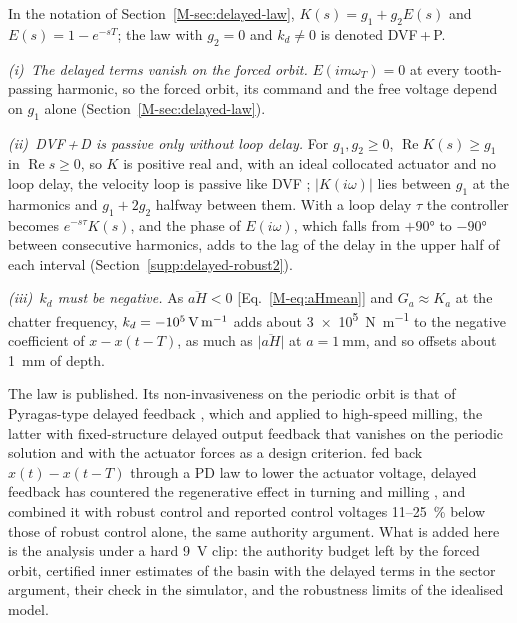 In the notation of Section~\ref{M-sec:delayed-law}, $K(s)=g_1+g_2E(s)$ and $E(s)=1-e^{-sT}$; the law with $g_2=0$ and $k_d\neq0$ is denoted DVF\,+\,P.

\emph{(i)~The delayed terms vanish on the forced orbit.} $E(im\omega_T)=0$ at every tooth-passing harmonic, so the forced orbit, its command and the free voltage depend on $g_1$ alone (Section~\ref{M-sec:delayed-law}).

\emph{(ii)~DVF\,+\,D is passive only without loop delay.} For $g_1,g_2\ge0$, $\operatorname{Re}K(s)\ge g_1$ in $\operatorname{Re}s\ge0$, so $K$ is positive real and, with an ideal collocated actuator and no loop delay, the velocity loop is passive like DVF \citep{elliott2001feedback}; $\lvert K(i\omega)\rvert$ lies between $g_1$ at the harmonics and $g_1+2g_2$ halfway between them. With a loop delay $\tau$ the controller becomes $e^{-s\tau}K(s)$, and the phase of $E(i\omega)$, which falls from $+\ang{90}$ to $-\ang{90}$ between consecutive harmonics, adds to the lag of the delay in the upper half of each interval (Section~\ref{supp:delayed-robust2}).

\emph{(iii)~$k_d$ must be negative.} As $\overline{aH}<0$ [Eq.~\eqref{M-eq:aHmean}] and $G_a\approx K_a$ at the chatter frequency, $k_d=\SI{-e5}{\volt\per\metre}$ adds about \SI{3e5}{\newton\per\metre} to the negative coefficient of $x-x(t-T)$, as much as $\lvert\overline{aH}\rvert$ at $a=\SI{1}{\milli\metre}$, and so offsets about \SI{1}{\milli\metre} of depth.

The law is published. Its non-invasiveness on the periodic orbit is that of Pyragas-type delayed feedback \citep{pyragas1992continuous}, which \citet{vandewouw2015ifac} and \citet{vandijk2015ijrnc} applied to high-speed milling, the latter with fixed-structure delayed output feedback that vanishes on the periodic solution and with the actuator forces as a design criterion. \citet{li2022ijamt} fed back $x(t)-x(t-T)$ through a PD law to lower the actuator voltage, delayed feedback has countered the regenerative effect in turning \citep{mancisidor2019mechatronics} and milling \citep{du2022time}, and \citet{du2024ijms} combined it with robust control and reported control voltages 11--\SI{25}{\percent} below those of robust control alone, the same authority argument. What is added here is the analysis under a hard \SI{9}{\volt} clip: the authority budget left by the forced orbit, certified inner estimates of the basin with the delayed terms in the sector argument, their check in the simulator, and the robustness limits of the idealised model.

